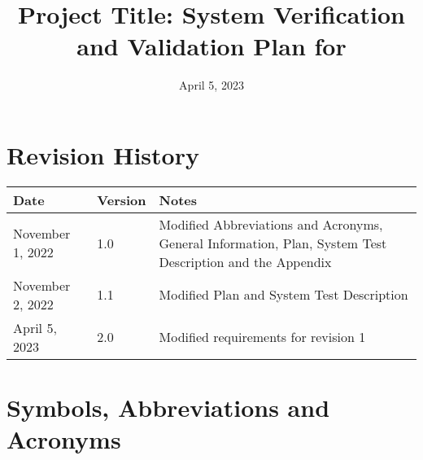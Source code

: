 \documentclass[12pt, titlepage]{article}
\begin{document}
\title{Project Title: System Verification and Validation Plan for \progname{}} 
\author{\authname}
\date{April 5, 2023}
	
\maketitle


\section{Revision History}

\begin{tabularx}{\textwidth}{p{3cm}p{2cm}X}
\toprule {\bf Date} & {\bf Version} & {\bf Notes}\\
\midrule
November 1, 2022 & 1.0 & Modified Abbreviations and Acronyms, General Information, Plan, System Test Description and the Appendix\\
November 2, 2022 & 1.1 & Modified Plan and System Test Description\\
April 5, 2023 & 2.0 & Modified requirements for revision 1\\
\bottomrule
\end{tabularx}

\newpage

\tableofcontents

\listoftables

\newpage

\section{Symbols, Abbreviations and Acronyms}
\end{document}
